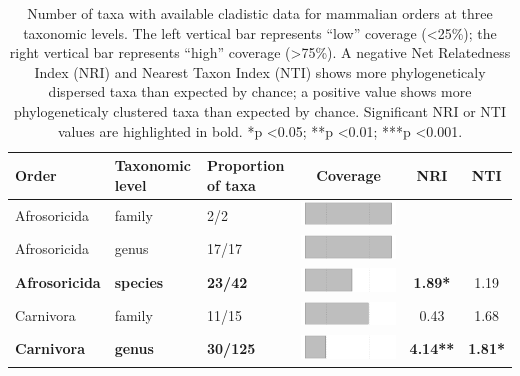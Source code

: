 \begin{longtable}{lL{1.8cm}C{2cm}ccc}
\caption[Number of taxa with available cladistic data for mammalian orders]{Number of taxa with available cladistic data for mammalian orders at three taxonomic levels. The left vertical bar represents ``low'' coverage (\textless 25\%); the right vertical bar represents ``high'' coverage (\textgreater 75\%). A negative Net Relatedness Index (NRI) and Nearest Taxon Index (NTI) shows more phylogeneticaly dispersed taxa than expected by chance; a positive value shows more phylogeneticaly clustered taxa than expected by chance. Significant NRI or NTI values are highlighted in bold. *p \textless 0.05; **p \textless 0.01; ***p \textless 0.001.} \\ 
  \hline
\textbf{Order} & \textbf{Taxonomic level} & \textbf{Proportion of taxa} & \textbf{Coverage} & \textbf{NRI} & \textbf{NTI} \\ 
  \hline
Afrosoricida & family & 2/2 & \includegraphics[width=0.20\linewidth, height=0.05\linewidth]{Missing_mammals/Table_figures/bar1.pdf} &   &   \\ 
  Afrosoricida & genus & 17/17 & \includegraphics[width=0.20\linewidth, height=0.05\linewidth]{Missing_mammals/Table_figures/bar2.pdf} &   &   \\ 
  \textbf{Afrosoricida} & \textbf{species} & \textbf{23/42} & \includegraphics[width=0.20\linewidth, height=0.05\linewidth]{Missing_mammals/Table_figures/bar3.pdf} & \textbf{1.89*} & 1.19 \\ 
  Carnivora & family & 11/15 & \includegraphics[width=0.20\linewidth, height=0.05\linewidth]{Missing_mammals/Table_figures/bar4.pdf} & 0.43 & 1.68 \\ 
  \textbf{Carnivora} & \textbf{genus} & \textbf{30/125} & \includegraphics[width=0.20\linewidth, height=0.05\linewidth]{Missing_mammals/Table_figures/bar5.pdf} & \textbf{4.14**} & \textbf{1.81*} \\ 

\end{longtable}
